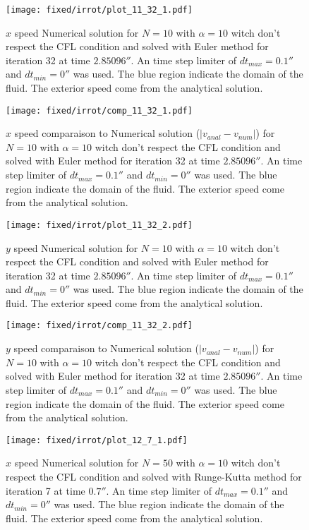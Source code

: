 \begin{figure}
\texttt{[image: fixed/irrot/plot\_11\_32\_1.pdf]}
\caption{$x$ speed Numerical solution for $N=10$ with $\alpha=10$ witch don't respect the CFL condition and solved with Euler method
for iteration 32 at time $\unit{2.85096}{\second}$.
An time step limiter of $dt_{max}=\unit{0.1}{\second}$ and $dt_{min}=\unit{0}{\second}$ was used.
The blue region indicate the domain of the fluid. The exterior speed come from the analytical solution.
\label{fix:plot_11_32_1}
}
\end{figure}

\begin{figure}
\texttt{[image: fixed/irrot/comp\_11\_32\_1.pdf]}
\caption{$x$ speed comparaison to Numerical solution ($|v_{anal}-v_{num}|$) for $N=10$ with $\alpha=10$ witch don't respect the CFL condition and solved with Euler method
for iteration 32 at time $\unit{2.85096}{\second}$.
An time step limiter of $dt_{max}=\unit{0.1}{\second}$ and $dt_{min}=\unit{0}{\second}$ was used.
The blue region indicate the domain of the fluid. The exterior speed come from the analytical solution.
\label{fix:comp_11_32_1}
}
\end{figure}
\begin{figure}
\texttt{[image: fixed/irrot/plot\_11\_32\_2.pdf]}
\caption{$y$ speed Numerical solution for $N=10$ with $\alpha=10$ witch don't respect the CFL condition and solved with Euler method
for iteration 32 at time $\unit{2.85096}{\second}$.
An time step limiter of $dt_{max}=\unit{0.1}{\second}$ and $dt_{min}=\unit{0}{\second}$ was used.
The blue region indicate the domain of the fluid. The exterior speed come from the analytical solution.
\label{fix:plot_11_32_2}
}
\end{figure}

\begin{figure}
\texttt{[image: fixed/irrot/comp\_11\_32\_2.pdf]}
\caption{$y$ speed comparaison to Numerical solution ($|v_{anal}-v_{num}|$) for $N=10$ with $\alpha=10$ witch don't respect the CFL condition and solved with Euler method
for iteration 32 at time $\unit{2.85096}{\second}$.
An time step limiter of $dt_{max}=\unit{0.1}{\second}$ and $dt_{min}=\unit{0}{\second}$ was used.
The blue region indicate the domain of the fluid. The exterior speed come from the analytical solution.
\label{fix:comp_11_32_2}
}
\end{figure}

\clearpage

\begin{figure}
\texttt{[image: fixed/irrot/plot\_12\_7\_1.pdf]}
\caption{$x$ speed Numerical solution for $N=50$ with $\alpha=10$ witch don't respect the CFL condition and solved with Runge-Kutta method
for iteration 7 at time $\unit{0.7}{\second}$.
An time step limiter of $dt_{max}=\unit{0.1}{\second}$ and $dt_{min}=\unit{0}{\second}$ was used.
The blue region indicate the domain of the fluid. The exterior speed come from the analytical solution.
\label{fix:plot_12_7_1}
}
\end{figure}

